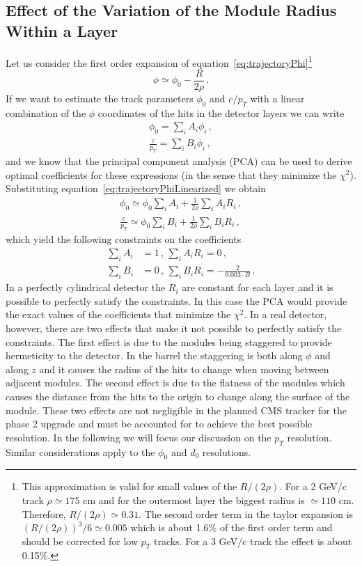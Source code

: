 \documentclass[10pt,a4paper]{report}
\begin{document}
\subsection{Effect of the Variation of the Module Radius Within a Layer}

Let us consider the first order expansion of equation~\ref{eq:trajectoryPhi}\footnote{This approximation is valid for small values of the $R/(2\rho)$. For a 2 GeV/c track $\rho \simeq 175$ cm and for the outermost layer the biggest radius is $\simeq 110$ cm. Therefore, $R/(2\rho) \simeq 0.31$. The second order term in the taylor expansion is $(R/(2\rho))^3/6 \simeq 0.005$ which is about 1.6\% of the first order term and should be corrected for low $p_T$ tracks. For a 3 GeV/c track the effect is about 0.15\%.}
\begin{equation}
\phi \simeq \phi_0 - \frac{R}{2\rho} \, .
\label{eq:trajectoryPhiLinearized}
\end{equation}
If we want to estimate the track parameters $\phi_0$ and $c/p_T$ with a linear combination of the $\phi$ coordinates of the hits in the detector layers we can write
\begin{align}
\phi_0 = \sum_i A_i \phi_i \, , \\
\frac{c}{p_T} = \sum_i B_i \phi_i \, ,
\label{eq:linearCombination}
\end{align}
and we know that the principal component analysis (PCA) can be used to derive optimal coefficients for these expressions (in the sense that they minimize the $\chi^2$). Substituting equation~\ref{eq:trajectoryPhiLinearized} we obtain
\begin{align}
\phi_0 \simeq \phi_0\sum_i A_i + \frac{1}{2\rho}\sum_i A_i R_i\, , \\
\frac{c}{p_T} \simeq \phi_0\sum_i B_i + \frac{1}{2\rho}\sum_i B_i R_i \, ,
\end{align}
which yield the following constraints on the coefficients
\begin{align}
\sum_i A_i &= 1\, , \, \sum_i A_i R_i = 0\, , \\
\sum_i B_i &= 0\, , \, \sum_i B_i R_i = -\frac{2}{0.003\cdot B}\, .
\end{align}
In a perfectly cylindrical detector the $R_i$ are constant for each layer and it is possible to perfectly satisfy the constraints. In this case the PCA would provide the exact values of the coefficients that minimize the $\chi^2$. In a real detector, however, there are two effects that make it not possible to perfectly satisfy the constraints. The first effect is due to the modules being staggered to provide hermeticity to the detector. In the barrel the staggering is both along $\phi$ and along $z$ and it causes the radius of the hits to change when moving between adjacent modules. The second effect is due to the flatness of the modules which causes the distance from the hits to the origin to change along the surface of the module. These two effects are not negligible in the planned CMS tracker for the phase 2 upgrade and must be accounted for to achieve the best possible resolution. In the following we will focus our discussion on the $p_T$ resolution. Similar considerations apply to the $\phi_0$ and $d_0$ resolutions.
\end{document}
